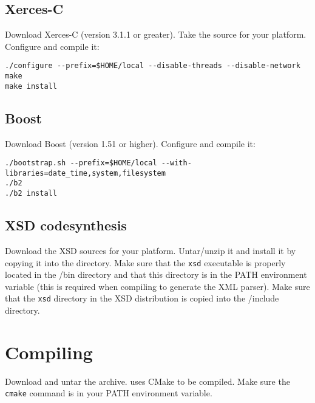 \subsection{Xerces-C}

Download Xerces-C (version 3.1.1 or greater). Take the source for your platform.
Configure and compile it:

\begin{verbatim}
./configure --prefix=$HOME/local --disable-threads --disable-network
make
make install
\end{verbatim}

\subsection{Boost}

Download Boost (version 1.51 or higher). Configure and compile it:

\begin{verbatim}
./bootstrap.sh --prefix=$HOME/local --with-libraries=date_time,system,filesystem 
./b2
./b2 install
\end{verbatim}

\subsection{XSD codesynthesis}

Download the XSD sources for your platform.
Untar/unzip it and install it by copying it into the \installdir directory.
Make sure that the \texttt{xsd} executable is properly located in the \installdir/bin
directory and that this directory is in the PATH environment variable (this is required
when compiling \Damaris{} to generate the XML parser). Make sure that the \texttt{xsd} directory
in the XSD distribution is copied into the \installdir/include directory.


\section{Compiling \Damaris{}}

Download and untar the \Damaris{} archive. \Damaris{} uses CMake to be compiled.
Make sure the \texttt{cmake} command is in your PATH environment variable.


